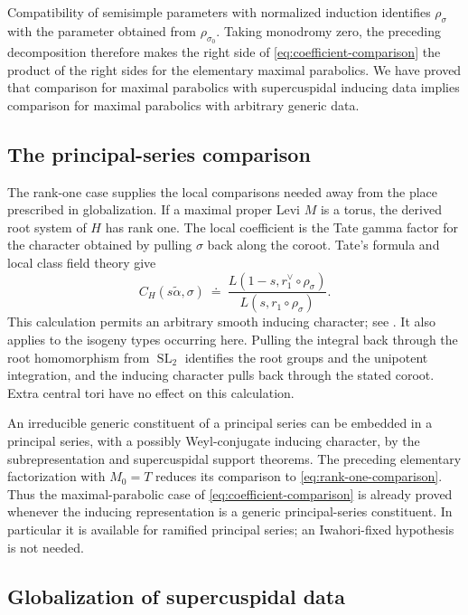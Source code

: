 Compatibility of semisimple parameters with normalized induction
identifies $\rho_\sigma$ with the parameter obtained from
$\rho_{\sigma_0}$.  Taking monodromy zero, the preceding decomposition
therefore makes the right side of
\eqref{eq:coefficient-comparison} the product of the right sides for
the elementary maximal parabolics.  We have proved that comparison
for maximal parabolics with supercuspidal inducing data implies
comparison for maximal parabolics with arbitrary generic data.

\subsection{The principal-series comparison}

The rank-one case supplies the local comparisons needed away from the
place prescribed in globalization.  If a maximal proper Levi $M$ is a
torus, the derived root system of $H$ has rank one.  The local
coefficient is the Tate gamma factor for the character obtained by
pulling $\sigma$ back along the coroot.  Tate's formula and local class
field theory give
\begin{equation}
 C_H(s\widetilde\alpha,\sigma)
   \ \doteq\
   \frac{L(1-s,r_1^\vee\circ\rho_\sigma)}
        {L(s,r_1\circ\rho_\sigma)}.
 \label{eq:rank-one-comparison}
\end{equation}
This calculation permits an arbitrary smooth inducing character;
see \cite[\S1.3]{LomeliLS}.  It also applies to the isogeny types
occurring here.  Pulling the integral back through the root
homomorphism from $\operatorname{SL}_2$ identifies the root groups
and the unipotent integration, and the inducing character pulls back
through the stated coroot.  Extra central tori have no effect on this
calculation.

An irreducible generic constituent of a principal series can be
embedded in a principal series, with a possibly Weyl-conjugate
inducing character, by the subrepresentation and supercuspidal
support theorems.  The preceding elementary factorization with
$M_0=T$ reduces its comparison to
\eqref{eq:rank-one-comparison}.  Thus the maximal-parabolic case of
\eqref{eq:coefficient-comparison} is already proved whenever the
inducing representation is a generic principal-series constituent.
In particular it is available for ramified principal series; an
Iwahori-fixed hypothesis is not needed.

\subsection{Globalization of supercuspidal data}

